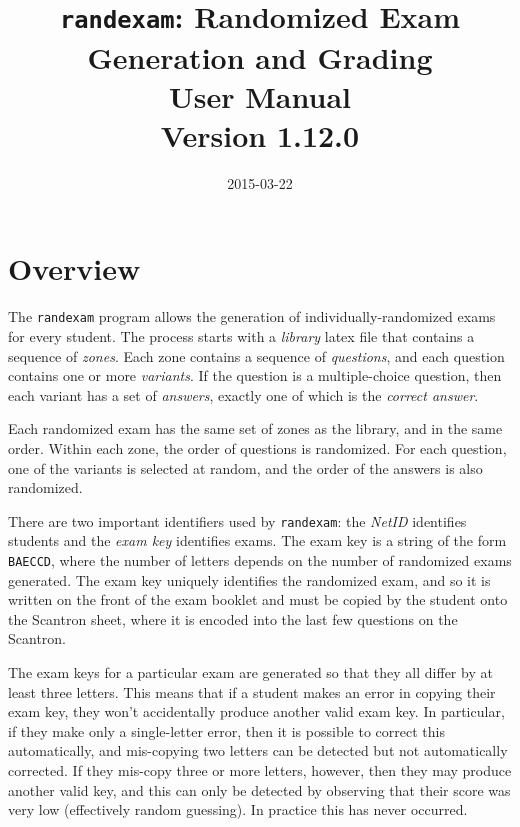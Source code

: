 \documentclass{article}
\begin{document}
\title{\texttt{randexam}: Randomized Exam Generation and Grading\\[1em] User Manual\\[1em] \Large Version 1.12.0}
\date{\vspace*{-2em}2015-03-22}
\maketitle

\section{Overview}

The \texttt{randexam} program allows the generation of
individually-randomized exams for every student. The process starts
with a \emph{library} latex file that contains a sequence of
\emph{zones}. Each zone contains a sequence of \emph{questions}, and
each question contains one or more \emph{variants}. If the question is
a multiple-choice question, then each variant has a set of
\emph{answers}, exactly one of which is the \emph{correct answer}.

Each randomized exam has the same set of zones as the library, and in
the same order. Within each zone, the order of questions is
randomized. For each question, one of the variants is selected at
random, and the order of the answers is also randomized.

There are two important identifiers used by \texttt{randexam}: the
\emph{NetID} identifies students and the \emph{exam key} identifies
exams. The exam key is a string of the form \texttt{BAECCD}, where the
number of letters depends on the number of randomized exams
generated. The exam key uniquely identifies the randomized exam, and
so it is written on the front of the exam booklet and must be copied
by the student onto the Scantron sheet, where it is encoded into the
last few questions on the Scantron.

The exam keys for a particular exam are generated so that they all
differ by at least three letters. This means that if a student makes
an error in copying their exam key, they won't accidentally produce
another valid exam key. In particular, if they make only a
single-letter error, then it is possible to correct this
automatically, and mis-copying two letters can be detected but not
automatically corrected. If they mis-copy three or more letters,
however, then they may produce another valid key, and this can only be
detected by observing that their score was very low (effectively
random guessing). In practice this has never occurred.
\end{document}
